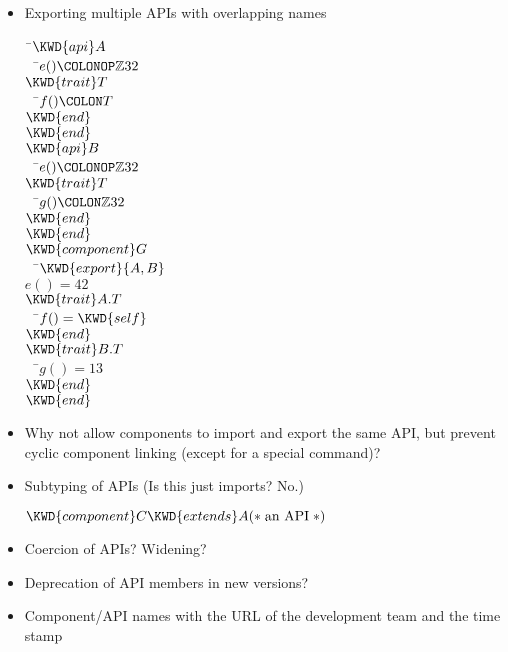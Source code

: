\begin{itemize}
  \item Exporting multiple APIs with overlapping names
\begin{Fortress}
{\tt~}\pushtabs\=\+\( \KWD{api} A\)\\
{\tt~~}\pushtabs\=\+\(   e()\COLONOP\mathbb{Z}32\)\\
\(   \KWD{trait} T\)\\
{\tt~~}\pushtabs\=\+\(     f()\COLON T\)\-\\\poptabs
\(   \KWD{end}\)\-\\\poptabs
\( \KWD{end}\)\\
\( \KWD{api} B\)\\
{\tt~~}\pushtabs\=\+\(   e()\COLONOP\mathbb{Z}32\)\\
\(   \KWD{trait} T\)\\
{\tt~~}\pushtabs\=\+\(     g()\COLON \mathbb{Z}32\)\-\\\poptabs
\(   \KWD{end}\)\-\\\poptabs
\( \KWD{end}\)\\
\( \KWD{component} G\)\\
{\tt~~}\pushtabs\=\+\(   \KWD{export} \{A, B\}\)\\
\(   e() = 42\)\\
\(   \KWD{trait} A.T\)\\
{\tt~~}\pushtabs\=\+\(     f() = \mathord{\KWD{self}}\)\-\\\poptabs
\(   \KWD{end}\)\\
\(   \KWD{trait} B.T\)\\
{\tt~~}\pushtabs\=\+\(     g() = 13\)\-\\\poptabs
\(   \KWD{end}\)\-\\\poptabs
\( \KWD{end}\)\-\\\poptabs
\end{Fortress}


  \item Why not allow components to import and export the same API, but
  prevent cyclic component linking (except for a special
   command)?

  \item Subtyping of APIs  (Is this just imports?  No.)
\begin{Fortress}
\(\KWD{component} C \KWD{extends} A \mathtt{(*}\;\hbox{\rm  an API \unskip}\;\mathtt{*)}\)
\end{Fortress}
  \item Coercion of APIs?  Widening?
  \item Deprecation of API members in new versions?
\item Component/API names with the URL of the development team and the time stamp

\end{itemize}

